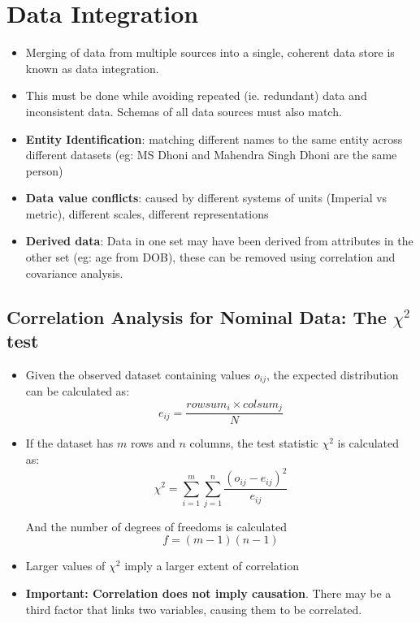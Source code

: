 \documentclass{article}
\theoremstyle{plain}
\theoremstyle{definition}
\begin{document}
\section{Data Integration}
\begin{itemize}
    \item Merging of data from multiple sources into a single, coherent data store is known as data integration. 
    
    \item This must be done while avoiding repeated (ie. redundant) data and inconsistent data. Schemas of all data sources must also match. 
    
    \item \textbf{Entity Identification}: matching different names to the same entity across different datasets (eg: MS Dhoni and Mahendra Singh Dhoni are the same person)
    
    \item \textbf{Data value conflicts}: caused by different systems of units (Imperial vs metric), different scales, different representations
    
    \item \textbf{Derived data}: Data in one set may have been derived from attributes in the other set (eg: age from DOB), these can be removed using correlation and covariance analysis. 
\end{itemize}

\subsection{Correlation Analysis for Nominal Data: The $\chi^2$ test}
\begin{itemize}
    \item Given the observed dataset containing values $o_{ij}$, the expected distribution can be calculated as:
    \begin{equation}
        e_{ij} = \frac{rowsum_i \times colsum_j}{N}
    \end{equation}
    
    \item If the dataset has $m$ rows and $n$ columns, the test statistic $\chi^2$ is calculated as:
    \begin{equation}
        \chi^2  = \sum_{i=1}^{m}\sum_{j = 1}^{n} \frac{(o_{ij} - e_{ij})^2}{e_{ij}}
    \end{equation}
    
    And the number of degrees of freedoms is calculated
    \begin{equation}
        f = (m-1)(n-1)
    \end{equation}
    
    \item Larger values of $\chi^2$ imply a larger extent of correlation
    
    \item \textbf{Important: Correlation does not imply causation}. There may be a third factor that links two variables, causing them to be correlated. 
\end{itemize}
\end{document}
